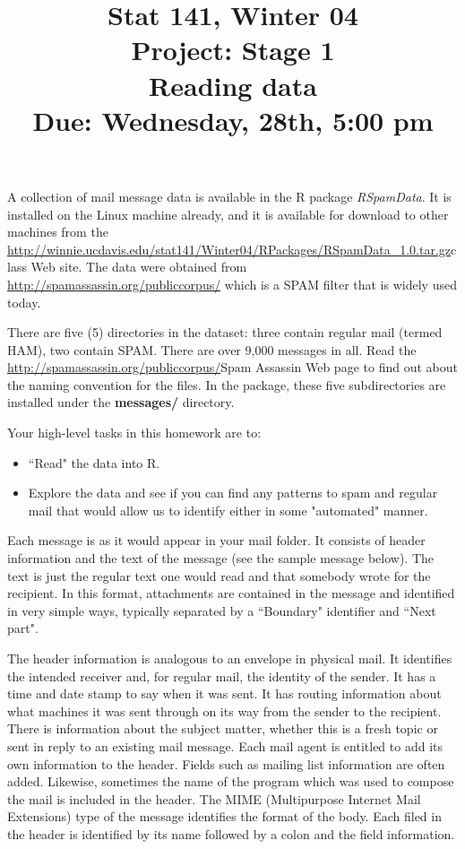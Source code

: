 \documentclass[10pt]{article}
\date{}
\title{Stat 141, Winter 04 \\
    Project: Stage 1\\
    Reading \SPAM{} data \\
   \textbf{Due:  Wednesday, 28th, 5:00 pm}\hfill
}
\def\SPAM{SPAM}
\def\Rpackage#1{\textit{#1}}
\begin{document}
\maketitle

A collection of mail message data is available in the R package
\Rpackage{RSpamData}.  It is installed on the Linux machine already,
and it is available for download to other machines from the
\url{http://winnie.ucdavis.edu/stat141/Winter04/RPackages/RSpamData_1.0.tar.gz}{class
  Web site}.  The data were obtained from
\url{http://spamassassin.org/publiccorpus/}
which is a \SPAM{} filter that is widely used today.


There are five (5) directories in the dataset: three contain regular
mail (termed HAM), two contain \SPAM.  There are over 9,000 messages
in all.  Read the \url{http://spamassassin.org/publiccorpus/}{Spam
  Assassin Web page} to find out about the naming convention for the
files.  In the package, these five subdirectories are installed under
the \textbf{messages/} directory.

Your high-level tasks in this homework are to:
\begin{itemize}
\item  ``Read" the data into R. 
\item Explore the data and see if you can find any patterns
 to spam and regular mail that would allow us to
 identify either in some "automated" manner.
\end{itemize}

Each message is as it would appear in your mail folder.  It consists
of header information and the text of the message (see the sample
message below).  The text is just the regular text one would read and that
somebody wrote for the recipient.  In this format, attachments are
contained in the message and identified in very simple ways, typically
separated by a ``Boundary" identifier and ``Next part".

The header information is analogous to an envelope in physical
mail. It identifies the intended receiver and, for regular mail, the
identity of the sender.  It has a time and date stamp to say when it
was sent.  It has routing information about what machines it was
sent through on its way from the sender to the recipient.  There is
information about the subject matter, whether this is a fresh topic or
sent in reply to an existing mail message.  Each mail agent is
entitled to add its own information to the header.  Fields such as
mailing list information are often added.  Likewise, sometimes the
name of the program which was used to compose the mail is included in
the header.  The MIME (Multipurpose Internet Mail Extensions) type of
the message identifies the format of the body.
Each filed in the header is identified by its name followed by a colon
and the field information.
\end{document}
